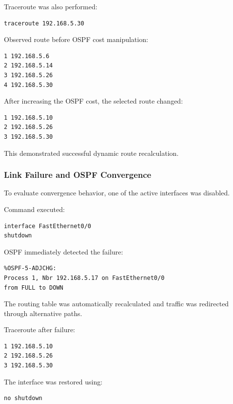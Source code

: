 \documentclass[12pt]{article}
\begin{document}
Traceroute was also performed:

\begin{lstlisting}
traceroute 192.168.5.30
\end{lstlisting}

Observed route before OSPF cost manipulation:

\begin{lstlisting}
1 192.168.5.6
2 192.168.5.14
3 192.168.5.26
4 192.168.5.30
\end{lstlisting}

After increasing the OSPF cost, the selected route changed:

\begin{lstlisting}
1 192.168.5.10
2 192.168.5.26
3 192.168.5.30
\end{lstlisting}

This demonstrated successful dynamic route recalculation.

\subsubsection{Link Failure and OSPF Convergence}

To evaluate convergence behavior, one of the active interfaces was disabled.

Command executed:

\begin{lstlisting}
interface FastEthernet0/0
shutdown
\end{lstlisting}

OSPF immediately detected the failure:

\begin{lstlisting}
%OSPF-5-ADJCHG:
Process 1, Nbr 192.168.5.17 on FastEthernet0/0
from FULL to DOWN
\end{lstlisting}

The routing table was automatically recalculated and traffic was redirected through alternative paths.

Traceroute after failure:

\begin{lstlisting}
1 192.168.5.10
2 192.168.5.26
3 192.168.5.30
\end{lstlisting}

The interface was restored using:

\begin{lstlisting}
no shutdown
\end{lstlisting}
\end{document}
